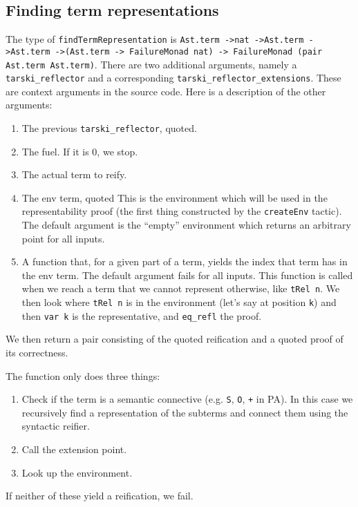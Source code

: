 \documentclass[11pt,a4paper]{article}
\begin{document}
\subsection{Finding term representations}
The type of \lstinline|findTermRepresentation| is \lstinline|Ast.term ->nat ->Ast.term ->Ast.term ->(Ast.term -> FailureMonad nat) -> FailureMonad (pair Ast.term Ast.term)|. There are two additional arguments, namely a \lstinline|tarski_reflector| and a corresponding
\lstinline|tarski_reflector_extensions|. These are context arguments in the source code. Here is a description of the other arguments:
\begin{enumerate}
\item The previous \lstinline|tarski_reflector|, quoted.
\item The fuel. If it is 0, we stop.
\item The actual term to reify.
\item The env term, quoted This is the environment which will be used in the representability proof (the first thing constructed by the \lstinline|createEnv| tactic). The default argument is the \enquote{empty} environment which returns an arbitrary point for all inputs.
\item A function that, for a given part of a term, yields the index that term has in the env term. The default argument fails for all inputs. This function is called when we reach a term that we cannot represent otherwise, like \lstinline|tRel n|. We then look where \lstinline|tRel n| is in the environment (let's say at position \lstinline|k|) and then \lstinline|var k| is the representative, and \lstinline|eq_refl| the proof.
\end{enumerate}
We then return a pair consisting of the quoted reification and a quoted proof of its correctness.

The function only does three things:
\begin{enumerate}
\item Check if the term is a semantic connective (e.g. \lstinline|S|, \lstinline|O|, \lstinline|+| in PA). In this case we recursively find a representation of the subterms and connect them using the syntactic reifier.
\item Call the extension point.
\item Look up the environment.
\end{enumerate}
If neither of these yield a reification, we fail.
\end{document}

